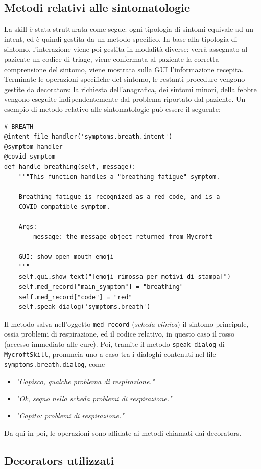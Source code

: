 \subsection{Metodi relativi alle sintomatologie}
La skill è stata strutturata come segue: ogni tipologia di sintomi equivale ad un intent, ed è quindi gestita da un metodo specifico. In base alla tipologia di sintomo, l'interazione viene poi gestita in modalità diverse: verrà assegnato al paziente un codice di triage, viene confermata al paziente la corretta comprensione del sintomo, viene mostrata sulla GUI l'informazione recepita. Terminate le operazioni specifiche del sintomo, le restanti procedure vengono gestite da decorators: la richiesta dell'anagrafica, dei sintomi minori, della febbre vengono eseguite indipendentemente dal problema riportato dal paziente. Un esempio di metodo relativo alle sintomatologie può essere il seguente:
\begin{verbatim}
# BREATH
@intent_file_handler('symptoms.breath.intent')
@symptom_handler
@covid_symptom
def handle_breathing(self, message):
    """This function handles a "breathing fatigue" symptom.

    Breathing fatigue is recognized as a red code, and is a
    COVID-compatible symptom.

    Args:
        message: the message object returned from Mycroft

    GUI: show open mouth emoji
    """
    self.gui.show_text("[emoji rimossa per motivi di stampa]")
    self.med_record["main_symptom"] = "breathing"
    self.med_record["code"] = "red"
    self.speak_dialog('symptoms.breath')
\end{verbatim}
Il metodo salva nell'oggetto \texttt{med\_record} (\textit{scheda clinica}) il sintomo principale, ossia problemi di respirazione, ed il codice relativo, in questo caso il rosso (accesso immediato alle cure). Poi, tramite il metodo \texttt{speak\_dialog} di \texttt{MycroftSkill}, pronuncia uno a caso tra i dialoghi contenuti nel file \texttt{symptoms.breath.dialog}, come
\begin{itemize}
  \item \textit{"Capisco, qualche problema di respirazione."}
  \item \textit{"Ok, segno nella scheda problemi di respirazione."}
  \item \textit{"Capito: problemi di respirazione."}
\end{itemize}
Da qui in poi, le operazioni sono affidate ai metodi chiamati dai decorators.
\subsection{Decorators utilizzati}
